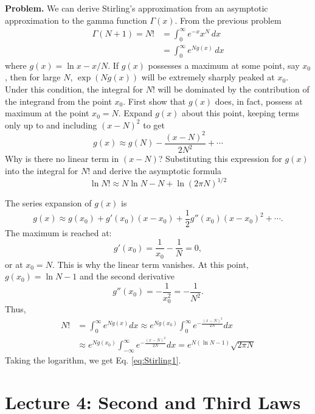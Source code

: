 \documentclass[twocolumn, 10pt]{article}
\numberwithin{equation}{section}
\newenvironment{problem}
{\par\medskip\sffamily \color{problue}
  \textbf{Problem. }\ignorespaces}
{\medskip}
\newenvironment{solution}[1][\empty]
{\par\medskip
  \textbf{\ifx\empty#1{Solution.}\relax\else{#1}\fi} \ignorespaces}
{\medskip}
\begin{document}
\begin{problem}
We can derive Stirling's approximation from
an asymptotic approximation to the gamma function $\Gamma(x)$.
From the previous problem
\begin{align*}
  \Gamma(N+1) = N!
  &= \int_0^\infty e^{-x} x^N \, dx
  \\
  &= \int_0^\infty e^{N g(x)} \, dx
\end{align*}
where $g(x) = \ln x - x/N$.
%
If $g(x)$ possesses a maximum at some point, say $x_0$,
then for large $N$, $\exp(N g(x))$ will be extremely
sharply peaked at $x_0$.
%
Under this condition, the integral for $N!$
will be dominated by the contribution of the integrand
from the point $x_0$.
%
First show that $g(x)$ does, in fact,
possess at maximum at the point $x_0 = N$.
%
Expand $g(x)$ about this point,
keeping terms only up to and including
$(x-N)^2$ to get
$$
g(x) \approx g(N) - \frac{ (x - N)^2 } { 2 N^2 } + \cdots
$$
Why is there no linear term in $(x-N)$?
Substituting this expression for $g(x)$
into the integral for $N!$ and derive the asymptotic formula
\begin{equation}
  \ln N! \approx N \ln N - N + \ln (2\pi N)^{1/2}
  \label{eq:Stirling1}
\end{equation}
\end{problem}

\begin{solution}
The series expansion of $g(x)$ is
$$
  g(x) \approx g(x_0)
  + g'(x_0) (x - x_0)
  + \frac{1}{2} g''(x_0) (x - x_0)^2
  + \cdots.
$$
The maximum is reached at:
$$
  g'(x_0) = \frac{1}{x_0} - \frac{1}{N} = 0,
$$
or at $x_0 = N$.
This is why the linear term vanishes.
%
At this point, $g(x_0) = \ln N - 1$
and the second derivative
$$
  g''(x_0) = -\frac{1}{x_0^2} = -\frac{1}{N^2}.
$$
%
Thus,
\begin{align*}
  N!
  &= \int_0^\infty e^{Ng(x)} dx
  \approx
  e^{Ng(x_0)}
  \int_0^\infty
  e^{- \frac{(x-N)^2}{2N} } dx
  \\
  &\approx
  e^{Ng(x_0)}
  \int_{-\infty}^\infty
  e^{- \frac{(x-N)^2}{2N} } dx
  =
  e^{N(\ln N - 1)} \sqrt{2\pi N}
\end{align*}
%
Taking the logarithm, we get Eq. \eqref{eq:Stirling1}.
\end{solution}

\section{Lecture 4: Second and Third Laws}
\end{document}
